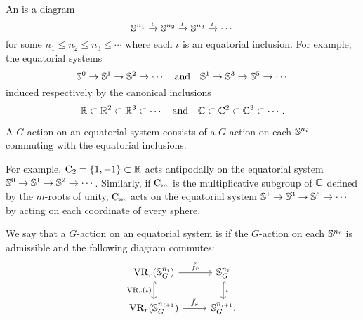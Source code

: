 %

\subsubsection{}

An  is a diagram
\[
\mathbb{S}^{n_1} \xrightarrow{\iota} \mathbb{S}^{n_2} \xrightarrow{\iota} \mathbb{S}^{n_3} \xrightarrow{\iota} \dotsb
\]
for some \(n_1 \leq n_2 \leq n_3 \leq \dotsb\) where each \(\iota\) is an equatorial inclusion.
For example, the equatorial systems
\[
\mathbb{S}^0 \to \mathbb{S}^1 \to \mathbb{S}^2 \to \dotsb
\quad\text{and}\quad
\mathbb{S}^1 \to \mathbb{S}^3 \to \mathbb{S}^5 \to \dotsb
\]
induced respectively by the canonical inclusions
\[
\mathbb{R} \subset \mathbb{R}^2 \subset \mathbb{R}^3 \subset \dotsb
\quad\text{and}\quad
\mathbb{C} \subset \mathbb{C}^2 \subset \mathbb{C}^3 \subset \dotsb.
\]

A \(G\)-action on an equatorial system consists of a \(G\)-action on each \(\mathbb{S}^{n_i}\) commuting with the equatorial inclusions.

For example, \(\mathrm{C}_2 = \{1,-1\} \subset \mathbb{R}\) acts antipodally on the equatorial system \(\mathbb{S}^0 \to \mathbb{S}^1 \to \mathbb{S}^2 \to \dotsb\).
Similarly, if \(\mathrm{C}_m\) is the multiplicative subgroup of \(\mathbb{C}\) defined by the \(m\)-roots of unity, \(\mathrm{C}_m\) acts on the equatorial system \(\mathbb{S}^1 \to \mathbb{S}^3 \to \mathbb{S}^5 \to \dotsb\) by acting on each coordinate of every sphere.

We say that a \(G\)-action on an equatorial system is  if the \(G\)-action on each \(\mathbb{S}^{n_i}\) is admissible and the following diagram commutes:
\[
\begin{tikzcd}
	\VR_r(\bS^{n_i}_G)
	\ar[d, hook, "{\VR_r(\iota)}" left]
	\ar[r, "\tilde f_r" above]
	&
	\bS^{n_i}_G
	\ar[d, hook, "\iota"]
	\\
	\VR_r(\bS^{n_{i+1}}_G)
	\ar[r, "\tilde f_r" above]
	&
	\bS^{n_{i+1}}_G.
\end{tikzcd}
\]

